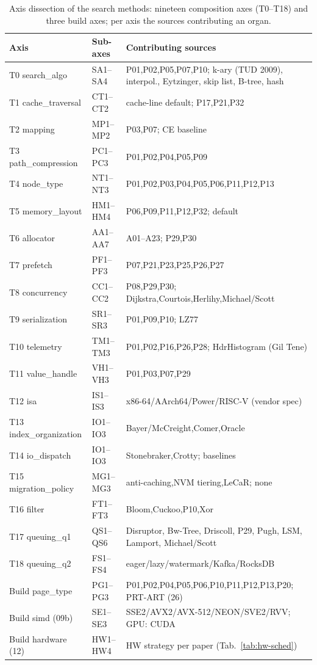 \begin{table}[!htbp]
  \caption{Axis dissection of the search methods: nineteen composition axes (T0--T18) and three
  build axes; per axis the sources contributing an organ.}\label{tab:axes-overview}
  \centering\footnotesize
  \begin{tabular}{@{}l l p{6.8cm}@{}}
    \toprule
    \textbf{Axis} & \textbf{Sub-axes} & \textbf{Contributing sources} \\
    \midrule
    T0 search\_algo & SA1--SA4 & P01,P02,P05,P07,P10; k-ary (TUD 2009), interpol., Eytzinger, skip list, B-tree, hash \\
    T1 cache\_traversal & CT1--CT2 & cache-line default; P17,P21,P32 \\
    T2 mapping & MP1--MP2 & P03,P07; CE baseline \\
    T3 path\_compression & PC1--PC3 & P01,P02,P04,P05,P09 \\
    T4 node\_type & NT1--NT3 & P01,P02,P03,P04,P05,P06,P11,P12,P13 \\
    T5 memory\_layout & HM1--HM4 & P06,P09,P11,P12,P32; default \\
    T6 allocator & AA1--AA7 & A01--A23; P29,P30 \\
    T7 prefetch & PF1--PF3 & P07,P21,P23,P25,P26,P27 \\
    T8 concurrency & CC1--CC2 & P08,P29,P30; Dijkstra,Courtois,Herlihy,Michael/Scott \\
    T9 serialization & SR1--SR3 & P01,P09,P10; LZ77 \\
    \midrule
    T10 telemetry & TM1--TM3 & P01,P02,P16,P26,P28; HdrHistogram (Gil Tene) \\
    T11 value\_handle & VH1--VH3 & P01,P03,P07,P29 \\
    T12 isa & IS1--IS3 & x86-64/AArch64/Power/RISC-V (vendor spec) \\
    T13 index\_organization & IO1--IO3 & Bayer/McCreight,Comer,Oracle \\
    T14 io\_dispatch & IO1--IO3 & Stonebraker,Crotty; baselines \\
    T15 migration\_policy & MG1--MG3 & anti-caching,NVM tiering,LeCaR\@; none \\
    T16 filter & FT1--FT3 & Bloom,Cuckoo,P10,Xor \\
    T17 queuing\_q1 & QS1--QS6 & Disruptor, Bw-Tree, Driscoll, P29, Pugh, LSM, Lamport, Michael/Scott \\
    T18 queuing\_q2 & FS1--FS4 & eager/lazy/watermark/Kafka/RocksDB \\
    \midrule
    Build page\_type & PG1--PG3 & P01,P02,P04,P05,P06,P10,P11,P12,P13,P20; PRT-ART (26) \\
    Build simd (09b) & SE1--SE3 & SSE2/AVX2/AVX-512/NEON/SVE2/RVV\@; GPU\@: CUDA \\
    Build hardware (12) & HW1--HW4 & HW strategy per paper (Tab.~\ref{tab:hw-sched}) \\
    \bottomrule
  \end{tabular}
\end{table}

